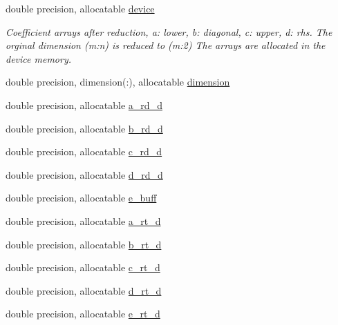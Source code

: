 \begin{DoxyCompactItemize}
\item 
double precision, allocatable \hyperlink{structpascal__tdma__cuda_1_1ptdma__plan__many__cuda_a408b2ea72e6272addd9d1c2115d133b7}{device}
\begin{DoxyCompactList}\small\item\em Coefficient arrays after reduction, a\+: lower, b\+: diagonal, c\+: upper, d\+: rhs. The orginal dimension (m\+:n) is reduced to (m\+:2) The arrays are allocated in the device memory. \end{DoxyCompactList}\item 
double precision, dimension(\+:), allocatable \hyperlink{structpascal__tdma__cuda_1_1ptdma__plan__many__cuda_a7a74d732f01a8db80e6fea40237fd619}{dimension}
\item 
double precision, allocatable \hyperlink{structpascal__tdma__cuda_1_1ptdma__plan__many__cuda_ac119b2bb89cb1975879959161b1ea1f3}{a\+\_\+rd\+\_\+d}
\item 
double precision, allocatable \hyperlink{structpascal__tdma__cuda_1_1ptdma__plan__many__cuda_a0dbc902b5d5d7622e905d4bcdc97a972}{b\+\_\+rd\+\_\+d}
\item 
double precision, allocatable \hyperlink{structpascal__tdma__cuda_1_1ptdma__plan__many__cuda_a4f2fd00c32e504cc3b0d16d7c7558cc1}{c\+\_\+rd\+\_\+d}
\item 
double precision, allocatable \hyperlink{structpascal__tdma__cuda_1_1ptdma__plan__many__cuda_a5e58f4e3a2c9a8bd8c33e72e3e2cd4eb}{d\+\_\+rd\+\_\+d}
\end{DoxyCompactItemize}

\textbf{ }\par
\begin{DoxyCompactItemize}
\item 
double precision, allocatable \hyperlink{structpascal__tdma__cuda_1_1ptdma__plan__many__cuda_a1a98ce23bb02a30a0fdf3cbc3bbce8c6}{e\+\_\+buff}
\end{DoxyCompactItemize}

\textbf{ }\par
\begin{DoxyCompactItemize}
\item 
double precision, allocatable \hyperlink{structpascal__tdma__cuda_1_1ptdma__plan__many__cuda_a9c5a1cdde14c466d8d82943aabc99803}{a\+\_\+rt\+\_\+d}
\item 
double precision, allocatable \hyperlink{structpascal__tdma__cuda_1_1ptdma__plan__many__cuda_a67a8f62b3d035a1187832067da91edd8}{b\+\_\+rt\+\_\+d}
\item 
double precision, allocatable \hyperlink{structpascal__tdma__cuda_1_1ptdma__plan__many__cuda_a8cee9d1ef8e63c242839cf073df164a4}{c\+\_\+rt\+\_\+d}
\item 
double precision, allocatable \hyperlink{structpascal__tdma__cuda_1_1ptdma__plan__many__cuda_aaa47db7d772e950224cb7e1ec0f246a8}{d\+\_\+rt\+\_\+d}
\item 
double precision, allocatable \hyperlink{structpascal__tdma__cuda_1_1ptdma__plan__many__cuda_a36c4e454f031ec49adf6244177fa7917}{e\+\_\+rt\+\_\+d}
\end{DoxyCompactItemize}

